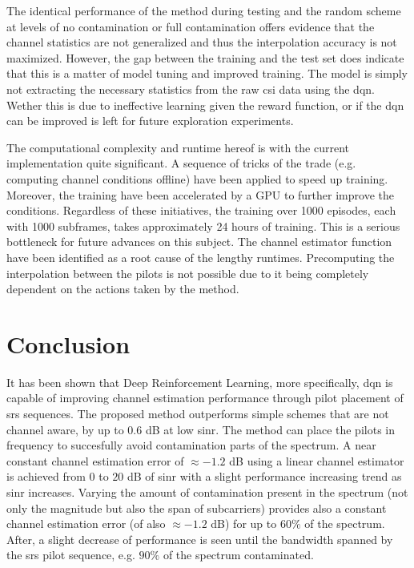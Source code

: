 The identical performance of the method during testing and the random scheme at levels of no contamination or full contamination offers evidence that the channel statistics are not generalized and thus the interpolation accuracy is not maximized. However, the gap between the training and the test set does indicate that this is a matter of model tuning and improved training. The model is simply not extracting the necessary statistics from the raw \gls{csi} data using the \gls{dqn}. Wether this is due to ineffective learning given the reward function, or if the \gls{dqn} can be improved is left for future exploration experiments.

The computational complexity and runtime hereof is with the current implementation quite significant. A sequence of tricks of the trade (e.g. computing channel conditions offline) have been applied to speed up training. Moreover, the training have been accelerated by a GPU to further improve the conditions. Regardless of these initiatives, the training over 1000 episodes, each with 1000 subframes, takes approximately 24 hours of training. This is a serious bottleneck for future advances on this subject. The channel estimator function have been identified as a root cause of the lengthy runtimes. Precomputing the interpolation between the pilots is not possible due to it being completely dependent on the actions taken by the method.



\section{Conclusion}\label{sec:RL_conclusion}
It has been shown that Deep Reinforcement Learning, more specifically, \gls{dqn} is capable of improving channel estimation performance through pilot placement of \gls{srs} sequences. The proposed method outperforms simple schemes that are not channel aware, by up to $0.6$ dB at low \gls{sinr}. The method can place the pilots in frequency to succesfully avoid contamination parts of the spectrum. A  near constant channel estimation error of $\approx -1.2$ dB using a linear channel estimator is achieved from $0$ to $20$ dB of \gls{sinr} with a slight performance increasing trend as \gls{sinr} increases. Varying the amount of contamination present in the spectrum (not only the magnitude but also the span of subcarriers) provides also a constant channel estimation error (of also $\approx -1.2$ dB) for up to $60\%$ of the spectrum. After, a slight decrease of performance is seen until the bandwidth spanned by the \gls{srs} pilot sequence, e.g. $90 \%$ of the spectrum contaminated. 


